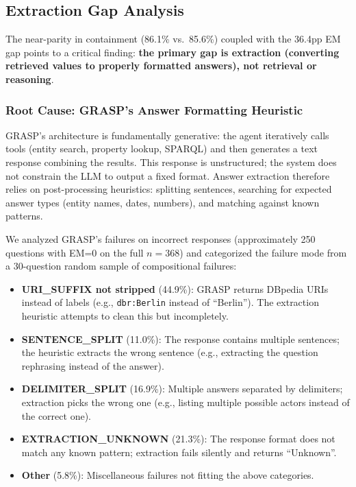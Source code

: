 \subsection{Extraction Gap Analysis}
\label{sec:extraction-analysis}

The near-parity in containment (86.1\% vs.\ 85.6\%) coupled with the 36.4pp EM gap points to a critical finding: \textbf{the primary gap is extraction (converting retrieved values to properly formatted answers), not retrieval or reasoning}.

\subsubsection{Root Cause: GRASP's Answer Formatting Heuristic}

GRASP's architecture is fundamentally generative: the agent iteratively calls tools (entity search, property lookup, SPARQL) and then generates a text response combining the results. This response is unstructured; the system does not constrain the LLM to output a fixed format. Answer extraction therefore relies on post-processing heuristics: splitting sentences, searching for expected answer types (entity names, dates, numbers), and matching against known patterns.

We analyzed GRASP's failures on incorrect responses (approximately 250 questions with EM=0 on the full $n=368$) and categorized the failure mode from a 30-question random sample of compositional failures:

\begin{itemize}
\item \textbf{URI\_SUFFIX not stripped} (44.9\%): GRASP returns DBpedia URIs instead of labels (e.g., \texttt{dbr:Berlin} instead of ``Berlin''). The extraction heuristic attempts to clean this but incompletely.
\item \textbf{SENTENCE\_SPLIT} (11.0\%): The response contains multiple sentences; the heuristic extracts the wrong sentence (e.g., extracting the question rephrasing instead of the answer).
\item \textbf{DELIMITER\_SPLIT} (16.9\%): Multiple answers separated by delimiters; extraction picks the wrong one (e.g., listing multiple possible actors instead of the correct one).
\item \textbf{EXTRACTION\_UNKNOWN} (21.3\%): The response format does not match any known pattern; extraction fails silently and returns ``Unknown''.
\item \textbf{Other} (5.8\%): Miscellaneous failures not fitting the above categories.
\end{itemize}

